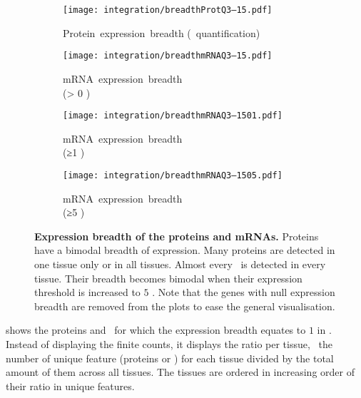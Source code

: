 \begin{figure}[!htb]
    \begin{subfigure}[h]{0.53\textwidth}
    \captionsetup{margin=0.6cm,justification=centering}
        \centering \texttt{[image: integration/breadthProtQ3--15.pdf]}
        \caption{Protein~expression~breadth (\PPKM~quantification)}\label{fig:protBreadth}
    \end{subfigure}
    \begin{subfigure}[h]{0.53\textwidth}
    \captionsetup{margin=0.6cm,justification=centering}
        \centering \texttt{[image: integration/breadthmRNAQ3--15.pdf]}
        \caption{mRNA~expression~breadth\\(> 0 \FPKM)}\label{fig:mRNAbreadth0}
    \end{subfigure}
    \vspace{2.5mm}

    \begin{subfigure}[b]{0.53\textwidth}
    \captionsetup{margin=0.6cm,justification=centering}
        \centering \texttt{[image: integration/breadthmRNAQ3--1501.pdf]}
        \caption{mRNA~expression~breadth\\(≥1 \FPKM)}\label{fig:mRNAbreadth1}
    \end{subfigure}
    \begin{subfigure}[b]{0.53\textwidth}
    \captionsetup{margin=0.6cm,justification=centering}
        \centering \texttt{[image: integration/breadthmRNAQ3--1505.pdf]}
        \caption{mRNA~expression~breadth\\(≥5 \FPKM)}\label{fig:mRNAbreadth5}
    \end{subfigure}
    \vspace{-5mm}
    \caption[Expression breadth of the proteins and mRNAs]{\label{fig:expressionBreadth}%
    \textbf{Expression breadth of the proteins and mRNAs.}
    Proteins have a bimodal breadth of expression.
    Many proteins are detected in one tissue only or in all tissues.
    Almost every \mRNA\ is detected in every tissue.
    Their breadth becomes bimodal when their expression threshold
    is increased to $5$ \FPKM{}.
    Note that the genes with null expression breadth are removed from the plots
    to ease the general visualisation.
    }
\end{figure}

 shows the proteins and \mRNAs\
for which the expression breadth equates to $1$ in .
Instead of displaying the finite counts,
it displays the ratio per tissue,
\ie\ the number of unique feature (proteins or \mRNAs)
for each tissue divided by the total amount of them across all tissues.
The tissues are ordered in increasing order of their ratio in unique features.

